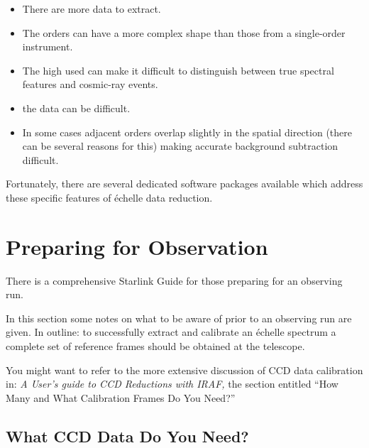 \begin{itemize}

\item There are more data to extract.

\item The orders can have a more complex shape than those from a
      single-order instrument.

\item The high  used can make
      it difficult to distinguish
      between true spectral features and cosmic-ray events.

\item {} the data can be difficult.

\item In some cases adjacent orders overlap slightly in the spatial
      direction (there can be several reasons for this) making
      accurate background subtraction difficult.

\end{itemize}

Fortunately, there are several dedicated software packages available
which address these specific features of \'{e}chelle data reduction.

\section{\label{se_preparation}Preparing for Observation}

There is a comprehensive Starlink Guide for those preparing for
an observing run\sgspec{---}{ - }.

In this section some notes on what to be aware of prior to an observing
run are given.
In outline: to successfully extract and calibrate an \'{e}chelle spectrum
a complete set of reference frames should be obtained at the telescope.

You might want to refer to the more extensive discussion of CCD data
calibration in: {\sl A User's guide to CCD Reductions with IRAF,} the
section entitled ``How Many and What Calibration Frames Do You Need?''


\subsection{What CCD Data Do You Need?}

